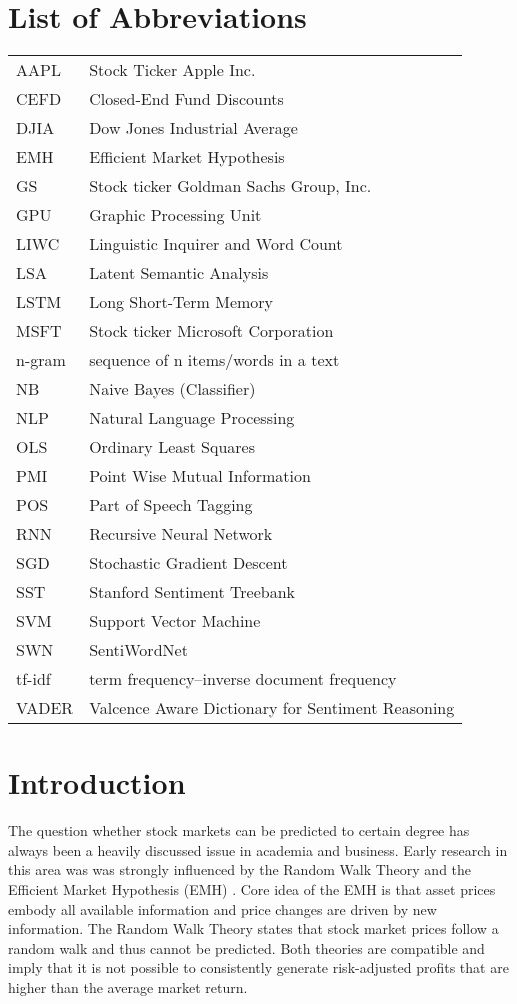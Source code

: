 \documentclass[a4paper,12pt]{article}%
\begin{document}
\section*{List of Abbreviations}
\begin{longtable}[l]{p{60pt} p{500pt}}
AAPL & Stock Ticker Apple Inc.\\
CEFD & Closed-End Fund Discounts \\
DJIA & Dow Jones Industrial Average\\
EMH & Efficient Market Hypothesis \\
GS & Stock ticker Goldman Sachs Group, Inc. \\
GPU & Graphic Processing Unit \\
LIWC & Linguistic Inquirer and Word Count \\
LSA 	& Latent Semantic Analysis \\
LSTM & Long Short-Term Memory \\
MSFT & Stock ticker Microsoft Corporation\\
n-gram & sequence of n items/words in a text \\
NB & Naive Bayes (Classifier) \\
NLP 	& Natural Language Processing \\
OLS & Ordinary Least Squares \\
PMI 	& Point Wise Mutual Information \\
POS & Part of Speech Tagging \\
RNN 	& Recursive Neural Network	 \\
SGD	& Stochastic Gradient Descent \\
SST & Stanford Sentiment Treebank \\
SVM & Support Vector Machine \\
SWN & SentiWordNet \\
tf-idf & term frequency–inverse document frequency \\
VADER & Valcence Aware Dictionary for Sentiment Reasoning
\end{longtable}

\newpage

\setcounter{page}{1}
\section{Introduction}
The question whether stock markets can be predicted to certain degree has always been a heavily discussed issue in academia and business. Early research in this area was was strongly influenced by the Random Walk Theory \citep{Fama1965a, Cootner1964} and the
 Efficient Market Hypothesis (EMH) \citep{Fama1965b, Fama1969}. Core idea of the EMH is that asset prices embody all available information and price changes are driven by new information. The Random Walk Theory states that stock market prices follow a random walk and thus cannot be predicted. Both theories are compatible and imply that it is not possible to consistently generate risk-adjusted profits that are higher than the average market return.
 
\end{document}
